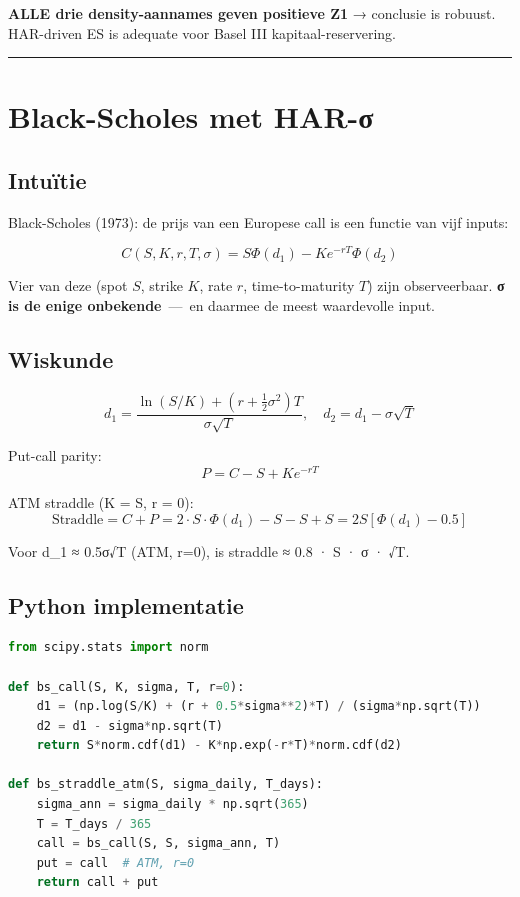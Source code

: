 \documentclass[11pt,a4paper]{article}
\begin{document}
\textbf{ALLE drie density-aannames geven positieve Z1} → conclusie is robuust. HAR-driven ES is adequate voor Basel III kapitaal-reservering.

\begin{center}\rule{0.5\linewidth}{0.5pt}\end{center}

\hypertarget{black-scholes-met-har-ux3c3}{%
\section{Black-Scholes met HAR-σ}\label{black-scholes-met-har-ux3c3}}

\hypertarget{intuuxeftie-11}{%
\subsection{Intuïtie}\label{intuuxeftie-11}}

Black-Scholes (1973): de prijs van een Europese call is een functie van vijf inputs:

\[C(S, K, r, T, \sigma) = S \Phi(d_1) - K e^{-rT} \Phi(d_2)\]

Vier van deze (spot \(S\), strike \(K\), rate \(r\), time-to-maturity \(T\)) zijn observeerbaar. \textbf{σ is de enige onbekende} \,---\, en daarmee de meest waardevolle input.

\hypertarget{wiskunde-4}{%
\subsection{Wiskunde}\label{wiskunde-4}}

\[d_1 = \frac{\ln(S/K) + (r + \frac{1}{2}\sigma^2)T}{\sigma \sqrt{T}}, \quad d_2 = d_1 - \sigma\sqrt{T}\]

Put-call parity:
\[P = C - S + K e^{-rT}\]

ATM straddle (K = S, r = 0):
\[\text{Straddle} = C + P = 2 \cdot S \cdot \Phi(d_1) - S - S + S = 2S[\Phi(d_1) - 0.5]\]

Voor d\_1 ≈ 0.5σ√T (ATM, r=0), is straddle ≈ 0.8 · S · σ · √T.

\hypertarget{python-implementatie-2}{%
\subsection{Python implementatie}\label{python-implementatie-2}}

\begin{lstlisting}[language=Python]
from scipy.stats import norm

def bs_call(S, K, sigma, T, r=0):
    d1 = (np.log(S/K) + (r + 0.5*sigma**2)*T) / (sigma*np.sqrt(T))
    d2 = d1 - sigma*np.sqrt(T)
    return S*norm.cdf(d1) - K*np.exp(-r*T)*norm.cdf(d2)

def bs_straddle_atm(S, sigma_daily, T_days):
    sigma_ann = sigma_daily * np.sqrt(365)
    T = T_days / 365
    call = bs_call(S, S, sigma_ann, T)
    put = call  # ATM, r=0
    return call + put
\end{lstlisting}
\end{document}
